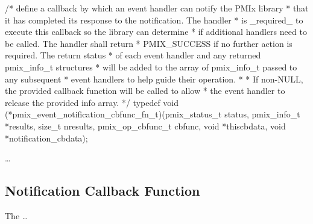 \cspecificstart
\begin{codepar}
/* define a callback by which an event handler can notify the PMIx library
 * that it has completed its response to the notification. The handler
 * is _required_ to execute this callback so the library can determine
 * if additional handlers need to be called. The handler shall return
 * PMIX_SUCCESS if no further action is required. The return status
 * of each event handler and any returned pmix_info_t structures
 * will be added to the array of pmix_info_t passed to any subsequent
 * event handlers to help guide their operation.
 *
 * If non-NULL, the provided callback function will be called to allow
 * the event handler to release the provided info array.
 */
typedef void (*pmix_event_notification_cbfunc_fn_t)(pmix_status_t status,
                                                    pmix_info_t *results, size_t nresults,
                                                    pmix_op_cbfunc_t cbfunc, void *thiscbdata,
                                                    void *notification_cbdata);
\end{codepar}
\cspecificend

\descr

\ldots


\subsection{Notification Callback Function}

The  \ldots

